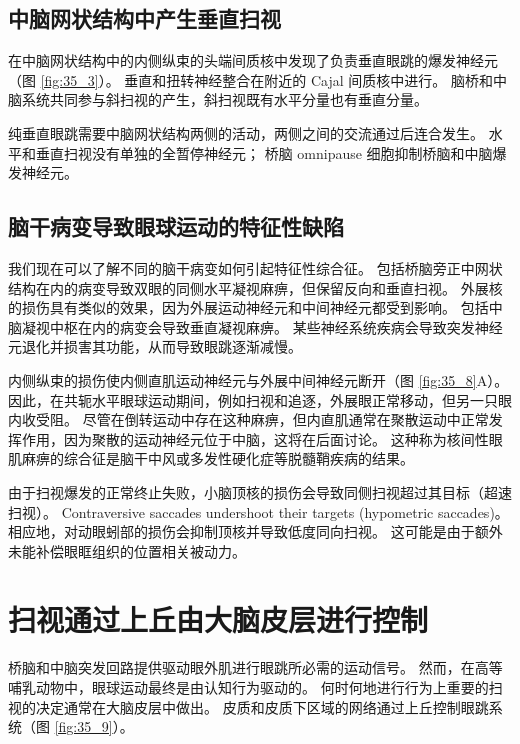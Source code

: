\subsection{中脑网状结构中产生垂直扫视}

在中脑网状结构中的内侧纵束的头端间质核中发现了负责垂直眼跳的爆发神经元（图 \ref{fig:35_3}）。
垂直和扭转神经整合在附近的 Cajal 间质核中进行。
脑桥和中脑系统共同参与斜扫视的产生，斜扫视既有水平分量也有垂直分量。


纯垂直眼跳需要中脑网状结构两侧的活动，两侧之间的交流通过后连合发生。
水平和垂直扫视没有单独的全暂停神经元；
桥脑 omnipause 细胞抑制桥脑和中脑爆发神经元。


\subsection{脑干病变导致眼球运动的特征性缺陷}

我们现在可以了解不同的脑干病变如何引起特征性综合征。
包括桥脑旁正中网状结构在内的病变导致双眼的同侧水平凝视麻痹，但保留反向和垂直扫视。
外展核的损伤具有类似的效果，因为外展运动神经元和中间神经元都受到影响。
包括中脑凝视中枢在内的病变会导致垂直凝视麻痹。
某些神经系统疾病会导致突发神经元退化并损害其功能，从而导致眼跳逐渐减慢。


内侧纵束的损伤使内侧直肌运动神经元与外展中间神经元断开（图 \ref{fig:35_8}A）。
因此，在共轭水平眼球运动期间，例如扫视和追逐，外展眼正常移动，但另一只眼内收受阻。
尽管在倒转运动中存在这种麻痹，但内直肌通常在聚散运动中正常发挥作用，因为聚散的运动神经元位于中脑，这将在后面讨论。
这种称为核间性眼肌麻痹的综合征是脑干中风或多发性硬化症等脱髓鞘疾病的结果。


由于扫视爆发的正常终止失败，小脑顶核的损伤会导致同侧扫视超过其目标（超速扫视）。
Contraversive saccades undershoot their targets (hypometric saccades)。
相应地，对动眼蚓部的损伤会抑制顶核并导致低度同向扫视。
这可能是由于额外未能补偿眼眶组织的位置相关被动力。



\section{扫视通过上丘由大脑皮层进行控制}

桥脑和中脑突发回路提供驱动眼外肌进行眼跳所必需的运动信号。
然而，在高等哺乳动物中，眼球运动最终是由认知行为驱动的。
何时何地进行行为上重要的扫视的决定通常在大脑皮层中做出。
皮质和皮质下区域的网络通过上丘控制眼跳系统（图 \ref{fig:35_9}）。


